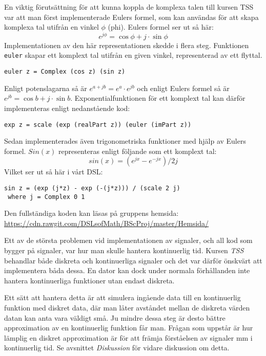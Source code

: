 \documentclass[12pt,a4paper,twoside,openright]{article}
\begin{document}
En viktig förutsättning för att kunna koppla de komplexa talen till
kursen TSS var att man först implementerade Eulers formel, som kan
användas för att skapa komplexa tal utifrån en vinkel \(\phi\)
(phi). Eulers formel ser ut så här:
\[e^{j\phi}=\cos \phi+ j \cdot \sin \phi \]
Implementationen av den här representationen skedde i flera steg.
Funktionen \texttt{euler} skapar ett komplext tal utifrån
en given vinkel, representerad av ett flyttal.
\begin{verbatim}
euler z = Complex (cos z) (sin z)
\end{verbatim}
Enligt potenslagarna
så är \(e^{a+jb} = e^{a} \cdot e^{jb}\) och enligt Eulers formel så är
\(e^{j b} = \cos b + j\cdot \sin b\).
Exponentialfunktionen för ett komplext tal kan därför implementeras
enligt nedanstående kod:

\begin{verbatim}
exp z = scale (exp (realPart z)) (euler (imPart z))
\end{verbatim}
Sedan implementerades även trigonometriska funktioner med hjälp av
Eulers formel. $Sin(x)$ representeras enligt följande som ett komplext
tal:
\[ sin(x) = (e^{j x} - e^{-j x}) / 2 j \]
Vilket ser ut så här i vårt DSL:
\begin{verbatim}
sin z = (exp (j*z) - exp (-(j*z))) / (scale 2 j)
 where j = Complex 0 1
\end{verbatim}

Den fullständiga koden kan läsas på gruppens hemsida:
\url{https://cdn.rawgit.com/DSLsofMath/BScProj/master/Hemsida/}

Ett av de största problemen vid implementationen av signaler, och all
kod som bygger på signaler, var hur man skulle hantera kontinuerlig
tid. Kursen \textit{TSS} behandlar både diskreta och kontinuerliga
signaler och det var därför önskvärt att implementera båda dessa. En
dator kan dock under normala förhållanden inte hantera kontinuerliga
funktioner utan endast
diskreta. %

Ett sätt att hantera detta är att simulera ingående data till en
kontinuerlig funktion med diskret data, där man låter avståndet mellan
de diskreta värden datan kan anta vara väldigt små. Ju mindre dessa
steg är desto bättre approximation av en kontinuerlig funktion får
man. Frågan som uppstår är hur lämplig en diskret approximation är för
att främja förståelsen av signaler mm i kontinuerlig tid. Se avsnittet
\textit{Diskussion} för vidare diskussion om detta.
\end{document}
